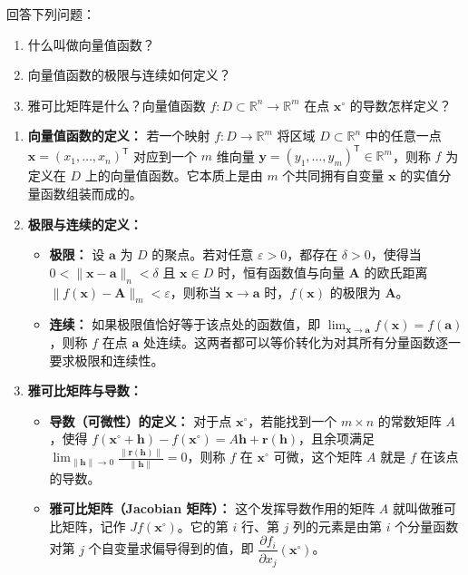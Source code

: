 \documentclass[lang=cn,11pt]{elegantbook}
\begin{document}
\begin{exercise}[概念与基本性质问答]
回答下列问题：
\begin{enumerate}
  \item[(1)] 什么叫做向量值函数？
  \item[(2)] 向量值函数的极限与连续如何定义？
  \item[(3)] 雅可比矩阵是什么？向量值函数 $f:D\subset\mathbb{R}^n\to\mathbb{R}^m$ 在点 $\boldsymbol x^\circ$ 的导数怎样定义？
\end{enumerate}
\end{exercise}
\begin{solution}
\begin{enumerate}
  \item[(1)] \textbf{向量值函数的定义：}
  若一个映射 $f: D \to \mathbb{R}^m$ 将区域 $D \subset \mathbb{R}^n$ 中的任意一点 $\boldsymbol x = (x_1, \dots, x_n)^{\mathsf T}$ 对应到一个 $m$ 维向量 $\boldsymbol y = (y_1, \dots, y_m)^{\mathsf T} \in \mathbb{R}^m$，则称 $f$ 为定义在 $D$ 上的向量值函数。它本质上是由 $m$ 个共同拥有自变量 $\boldsymbol x$ 的实值分量函数组装而成的。
  
  \item[(2)] \textbf{极限与连续的定义：}
  \begin{itemize}
    \item \textbf{极限：} 设 $\boldsymbol a$ 为 $D$ 的聚点。若对任意 $\varepsilon > 0$，都存在 $\delta > 0$，使得当 $0 < \|\boldsymbol x - \boldsymbol a\|_n < \delta$ 且 $\boldsymbol x \in D$ 时，恒有函数值与向量 $\boldsymbol A$ 的欧氏距离 $\|f(\boldsymbol x) - \boldsymbol A\|_m < \varepsilon$，则称当 $\boldsymbol x \to \boldsymbol a$ 时，$f(\boldsymbol x)$ 的极限为 $\boldsymbol A$。
    \item \textbf{连续：} 如果极限值恰好等于该点处的函数值，即 $\lim_{\boldsymbol x\to\boldsymbol a}f(\boldsymbol x)=f(\boldsymbol a)$，则称 $f$ 在点 $\boldsymbol a$ 处连续。这两者都可以等价转化为对其所有分量函数逐一要求极限和连续性。
  \end{itemize}
  
  \item[(3)] \textbf{雅可比矩阵与导数：}
  \begin{itemize}
    \item \textbf{导数（可微性）的定义：} 对于点 $\boldsymbol x^\circ$，若能找到一个 $m \times n$ 的常数矩阵 $A$，使得 $f(\boldsymbol x^\circ + \boldsymbol h) - f(\boldsymbol x^\circ) = A\boldsymbol h + \boldsymbol r(\boldsymbol h)$，且余项满足 $\lim_{\|\boldsymbol h\| \to 0} \frac{\|\boldsymbol r(\boldsymbol h)\|}{\|\boldsymbol h\|} = 0$，则称 $f$ 在 $\boldsymbol x^\circ$ 可微，这个矩阵 $A$ 就是 $f$ 在该点的导数。
    \item \textbf{雅可比矩阵（Jacobian 矩阵）：} 这个发挥导数作用的矩阵 $A$ 就叫做雅可比矩阵，记作 $Jf(\boldsymbol x^\circ)$。它的第 $i$ 行、第 $j$ 列的元素是由第 $i$ 个分量函数对第 $j$ 个自变量求偏导得到的值，即 $\dfrac{\partial f_i}{\partial x_j}(\boldsymbol x^\circ)$。
  \end{itemize}
\end{enumerate}
\end{solution}
\end{document}
